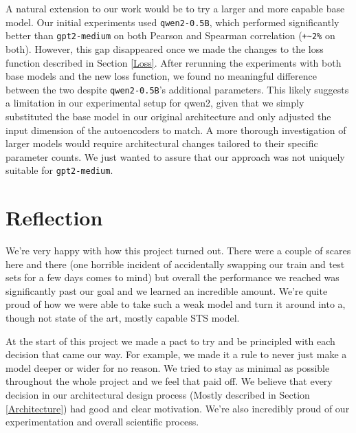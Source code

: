 \documentclass{article}
\begin{document}
A natural extension to our work would be to try a larger and more capable base model. Our initial experiments used \verb|qwen2-0.5B|, which performed significantly better than \verb|gpt2-medium| on both Pearson and Spearman correlation (\verb|+~2%| on both). However, this gap disappeared once we made the changes to the loss function described in Section \ref{Loss}. After rerunning the experiments with both base models and the new loss function, we found no meaningful difference between the two despite \verb|qwen2-0.5B|'s additional parameters. This likely suggests a limitation in our experimental setup for qwen2, given that we simply substituted the base model in our original architecture and only adjusted the input dimension of the autoencoders to match. A more thorough investigation of larger models would require architectural changes tailored to their specific parameter counts. We just wanted to assure that our approach was not uniquely suitable for \verb|gpt2-medium|.






\section{Reflection}
We're very happy with how this project turned out. There were a couple of scares here and there (one horrible incident of accidentally swapping our train and test sets for a few days comes to mind) but overall the performance we reached was significantly past our goal and we learned an incredible amount. We're quite proud of how we were able to take such a weak model and turn it around into a, though not state of the art, mostly capable STS model.

At the start of this project we made a pact to try and be principled with each decision that came our way. For example, we made it a rule to never just make a model deeper or wider for no reason. We tried to stay as minimal as possible throughout the whole project and we feel that paid off. We believe that every decision in our architectural design process (Mostly described in Section \ref{Architecture}) had good and clear motivation. We're also incredibly proud of our experimentation and overall scientific process.
\end{document}
